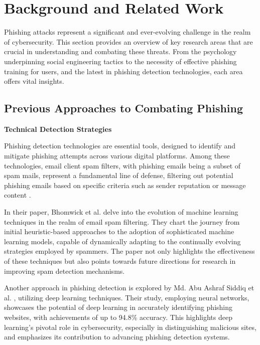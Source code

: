 \documentclass[
  a4paper,  %
  twoside,  %
  bibliography=totoc,
  headsepline,
  cleardoublepage=empty,
  parskip=half,
  draft=false
]{scrbook}
\begin{document}

\chapter{Background and Related Work}
\label{sec:relatedwork}

Phishing attacks represent a significant and ever-evolving challenge in the realm of cybersecurity. This section provides an overview of key research areas that are crucial in understanding and combating these threats.  From the psychology underpinning social engineering tactics to the necessity of effective phishing training for users, and the latest in phishing detection technologies, each area offers vital insights.

\section{Previous Approaches to Combating Phishing}
\textbf{Technical Detection Strategies}

Phishing detection technologies are essential tools, designed to identify and mitigate phishing attempts across various digital platforms. Among these technologies, email client spam filters, with phishing emails being a subset of spam mails, represent a fundamental line of defense, filtering out potential phishing emails based on specific criteria such as sender reputation \cite{shi} or message content \cite{alexy}.

In their paper, Bhomwick et al. \cite{alexy} delve into the evolution of machine learning techniques in the realm of email spam filtering. They chart the journey from initial heuristic-based approaches to the adoption of sophisticated machine learning models, capable of dynamically adapting to the continually evolving strategies employed by spammers. The paper not only highlights the effectiveness of these techniques but also points towards future directions for research in improving spam detection mechanisms.

Another approach in phishing detection is explored by Md. Abu Ashraf Siddiq et al. \cite{siddiq}, utilizing deep learning techniques. Their study, employing neural networks, showcases the potential of deep learning in accurately identifying phishing websites, with achievements of up to 94.8\% accuracy. This highlights deep learning's pivotal role in cybersecurity, especially in distinguishing malicious sites, and emphasizes its contribution to advancing phishing detection systems.
\end{document}
